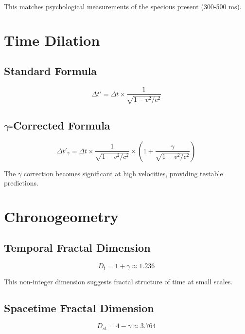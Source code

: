 \documentclass[12pt,a4paper]{article}
\begin{document}
This matches psychological measurements of the specious present (300-500 ms).

\section{Time Dilation}

\subsection{Standard Formula}

\begin{equation}
\Delta t' = \Delta t \times \frac{1}{\sqrt{1 - v^2/c^2}}
\end{equation}

\subsection{$\gamma$-Corrected Formula}

\begin{equation}
\Delta t'_\gamma = \Delta t \times \frac{1}{\sqrt{1 - v^2/c^2}} \times \left(1 + \frac{\gamma}{\sqrt{1 - v^2/c^2}}\right)
\end{equation}

The $\gamma$ correction becomes significant at high velocities, providing testable predictions.

\section{Chronogeometry}

\subsection{Temporal Fractal Dimension}

\begin{equation}
D_t = 1 + \gamma \approx 1.236
\end{equation}

This non-integer dimension suggests fractal structure of time at small scales.

\subsection{Spacetime Fractal Dimension}

\begin{equation}
D_{st} = 4 - \gamma \approx 3.764
\end{equation}
\end{document}
